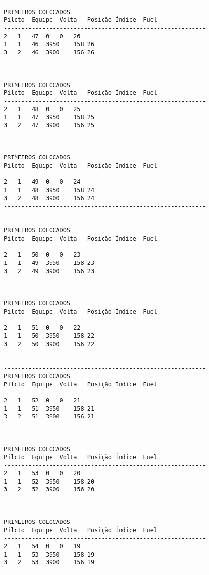 \documentclass[12pt]{article}
\begin{document}
\begin{verbatim}
----------------------------------------------------------
PRIMEIROS COLOCADOS
Piloto	Equipe	Volta	Posição	Índice	Fuel
----------------------------------------------------------
2	1	47	0	0	26
1	1	46	3950	158	26
3	2	46	3900	156	26
----------------------------------------------------------

----------------------------------------------------------
PRIMEIROS COLOCADOS
Piloto	Equipe	Volta	Posição	Índice	Fuel
----------------------------------------------------------
2	1	48	0	0	25
1	1	47	3950	158	25
3	2	47	3900	156	25
----------------------------------------------------------

----------------------------------------------------------
PRIMEIROS COLOCADOS
Piloto	Equipe	Volta	Posição	Índice	Fuel
----------------------------------------------------------
2	1	49	0	0	24
1	1	48	3950	158	24
3	2	48	3900	156	24
----------------------------------------------------------

----------------------------------------------------------
PRIMEIROS COLOCADOS
Piloto	Equipe	Volta	Posição	Índice	Fuel
----------------------------------------------------------
2	1	50	0	0	23
1	1	49	3950	158	23
3	2	49	3900	156	23
----------------------------------------------------------

----------------------------------------------------------
PRIMEIROS COLOCADOS
Piloto	Equipe	Volta	Posição	Índice	Fuel
----------------------------------------------------------
2	1	51	0	0	22
1	1	50	3950	158	22
3	2	50	3900	156	22
----------------------------------------------------------

----------------------------------------------------------
PRIMEIROS COLOCADOS
Piloto	Equipe	Volta	Posição	Índice	Fuel
----------------------------------------------------------
2	1	52	0	0	21
1	1	51	3950	158	21
3	2	51	3900	156	21
----------------------------------------------------------

----------------------------------------------------------
PRIMEIROS COLOCADOS
Piloto	Equipe	Volta	Posição	Índice	Fuel
----------------------------------------------------------
2	1	53	0	0	20
1	1	52	3950	158	20
3	2	52	3900	156	20
----------------------------------------------------------

----------------------------------------------------------
PRIMEIROS COLOCADOS
Piloto	Equipe	Volta	Posição	Índice	Fuel
----------------------------------------------------------
2	1	54	0	0	19
1	1	53	3950	158	19
3	2	53	3900	156	19
----------------------------------------------------------


\end{verbatim}
\end{document}
